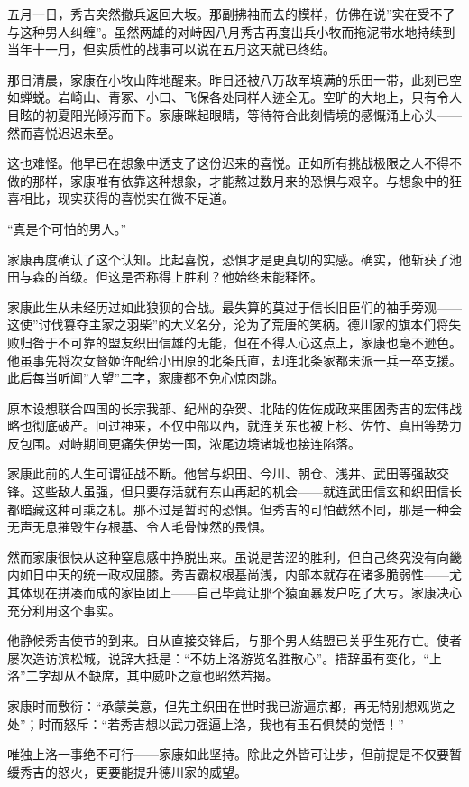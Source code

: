 \documentclass[
]{article}
\begin{document}
五月一日，秀吉突然撤兵返回大坂。那副拂袖而去的模样，仿佛在说''实在受不了与这种男人纠缠''。虽然两雄的对峙因八月秀吉再度出兵小牧而拖泥带水地持续到当年十一月，但实质性的战事可以说在五月这天就已终结。

那日清晨，家康在小牧山阵地醒来。昨日还被八万敌军填满的乐田一带，此刻已空如蝉蜕。岩崎山、青冢、小口、飞保各处同样人迹全无。空旷的大地上，只有令人目眩的初夏阳光倾泻而下。家康眯起眼睛，等待符合此刻情境的感慨涌上心头------然而喜悦迟迟未至。

这也难怪。他早已在想象中透支了这份迟来的喜悦。正如所有挑战极限之人不得不做的那样，家康唯有依靠这种想象，才能熬过数月来的恐惧与艰辛。与想象中的狂喜相比，现实获得的喜悦实在微不足道。

``真是个可怕的男人。''

家康再度确认了这个认知。比起喜悦，恐惧才是更真切的实感。确实，他斩获了池田与森的首级。但这是否称得上胜利？他始终未能释怀。

家康此生从未经历过如此狼狈的合战。最失算的莫过于信长旧臣们的袖手旁观------这使''讨伐篡夺主家之羽柴''的大义名分，沦为了荒唐的笑柄。德川家的旗本们将失败归咎于不可靠的盟友织田信雄的无能，但在不得人心这点上，家康也毫不逊色。他虽事先将次女督姬许配给小田原的北条氏直，却连北条家都未派一兵一卒支援。此后每当听闻''人望''二字，家康都不免心惊肉跳。

原本设想联合四国的长宗我部、纪州的杂贺、北陆的佐佐成政来围困秀吉的宏伟战略也彻底破产。回过神来，不仅中部以西，就连关东也被上杉、佐竹、真田等势力反包围。对峙期间更痛失伊势一国，浓尾边境诸城也接连陷落。

家康此前的人生可谓征战不断。他曾与织田、今川、朝仓、浅井、武田等强敌交锋。这些敌人虽强，但只要存活就有东山再起的机会------就连武田信玄和织田信长都暗藏这种可乘之机。那不过是暂时的恐惧。但秀吉的可怕截然不同，那是一种会无声无息摧毁生存根基、令人毛骨悚然的畏惧。

然而家康很快从这种窒息感中挣脱出来。虽说是苦涩的胜利，但自己终究没有向畿内如日中天的统一政权屈膝。秀吉霸权根基尚浅，内部本就存在诸多脆弱性------尤其体现在拼凑而成的家臣团上------自己毕竟让那个猿面暴发户吃了大亏。家康决心充分利用这个事实。

他静候秀吉使节的到来。自从直接交锋后，与那个男人结盟已关乎生死存亡。使者屡次造访滨松城，说辞大抵是：``不妨上洛游览名胜散心''。措辞虽有变化，``上洛''二字却从不缺席，其中威吓之意也昭然若揭。

家康时而敷衍：``承蒙美意，但先主织田在世时我已游遍京都，再无特别想观览之处''；时而怒斥：``若秀吉想以武力强逼上洛，我也有玉石俱焚的觉悟！''

唯独上洛一事绝不可行------家康如此坚持。除此之外皆可让步，但前提是不仅要暂缓秀吉的怒火，更要能提升德川家的威望。
\end{document}
